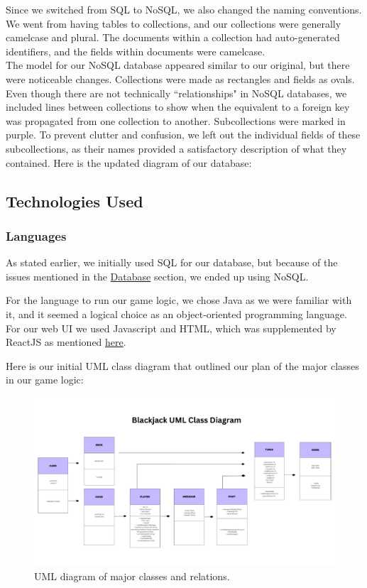 \noindent Since we switched from SQL to NoSQL, we also changed the naming conventions. We went from having tables to collections, and our collections were generally camelcase and plural. The documents within a collection had auto-generated identifiers, and the fields within documents were camelcase.\\

\noindent The model for our NoSQL database appeared similar to our original, but there were noticeable changes. Collections were made as rectangles and fields as ovals. Even though there are not technically ``relationships" in NoSQL databases, we included lines between collections to show when the equivalent to a foreign key was propagated from one collection to another. Subcollections were marked in purple. To prevent clutter and confusion, we left out the individual fields of these subcollections, as their names provided a satisfactory description of what they contained. Here is the updated diagram of our database:



\pagebreak

\subsection{Technologies Used}

\subsubsection{Languages}
As stated earlier, we initially used SQL for our database, but because of the issues mentioned in the \hyperref[sec:database]{Database} section, we ended up using NoSQL. 

For the language to run our game logic, we chose Java as we were familiar with it, and it seemed a logical choice as an object-oriented programming language. For our web UI we used Javascript and HTML, which was supplemented by ReactJS as mentioned \hyperref[sec:libs/mods/packs]{here}.

Here is our initial UML class diagram that outlined our plan of the major classes in our game logic:  

\begin{figure}[hbt!]
    \centering
    \includegraphics[width=0.8\linewidth]{figures/UML Diagram Whiteboard.pdf}
    \caption{UML diagram of major classes and relations.}
    \label{fig:UML}
\end{figure}

